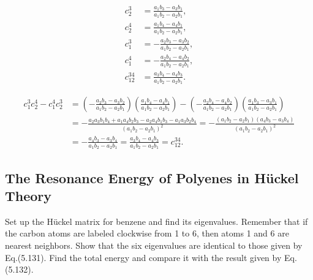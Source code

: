 \documentclass[a4paper]{book}
\newcounter{exercise}[chapter]
\newcounter{solution}[chapter]
\begin{document}
\begin{solution}
	\begin{align*}
		c^3_2 &= \frac{ a_1 b_3 - a_3 b_1 }{ a_1 b_2 - a_2 b_1 } , \\
		c^4_2 &= \frac{ a_1 b_4 - a_4 b_1 }{ a_1 b_2 - a_2 b_1 } , \\
		c^3_1 &= -\frac{ a_2 b_3 - a_3 b_2 }{ a_1 b_2 - a_2 b_1 } , \\
		c^4_1 &= -\frac{ a_2 b_4 - a_4 b_2 }{ a_1 b_2 - a_2 b_1 } , \\
		c^{34}_{12} &= \frac{ a_3 b_4 - a_4 b_3 }{ a_1 b_2 - a_2 b_1 }.
	\end{align*}
	
	\begin{align*}
		c^3_1 c^4_2 - c^4_1 c^3_2 &= \left( -\frac{ a_2 b_3 - a_3 b_2 }{ a_1 b_2 - a_2 b_1 } \right) \left( \frac{ a_1 b_4 - a_4 b_1 }{ a_1 b_2 - a_2 b_1 } \right) - \left( -\frac{ a_2 b_4 - a_4 b_2 }{ a_1 b_2 - a_2 b_1 } \right) \left( \frac{ a_1 b_3 - a_3 b_1 }{ a_1 b_2 - a_2 b_1 } \right) \\
		&= - \frac{ a_2 a_3 b_1 b_4 + a_1 a_4 b_2 b_3 - a_2 a_4 b_1 b_3 - a_1 a_3 b_2 b_4 }{ ( a_1 b_2 - a_2 b_1 )^2 } = - \frac{ ( a_1 b_2 - a_2 b_1 )( a_4 b_3 - a_3 b_4 ) }{ ( a_1 b_2 - a_2 b_1 )^2 } \\
		&= - \frac{ a_4 b_3 - a_3 b_4 }{ a_1 b_2 - a_2 b_1  } = \frac{ a_3 b_4 - a_4 b_3 }{ a_1 b_2 - a_2 b_1 } = c^{34}_{12}.
	\end{align*}
	
	\end{solution}
	
	\subsection{The Resonance Energy of Polyenes in H{\"u}ckel Theory}
	
	\begin{exercise}
	Set up the H{\"u}ckel matrix for benzene and find its eigenvalues. Remember that if the carbon atoms are labeled clockwise from 1 to 6, then atoms 1 and 6 are nearest neighbors. Show that the six eigenvalues are identical to those given by Eq.(5.131). Find the total energy and compare it with the result given by Eq.(5.132).
	\end{exercise}
	
\end{document}
